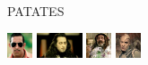 \documentclass{exam}
\begin{document}
\begin{questions}
\question PATATES\newline
\begin{oneparchoices}
\choice \includegraphics[height=2em]{arifisik.jpg}
\choice \includegraphics[height=2em]{komutanlogar.jpeg}
\choice \includegraphics[height=2em]{faruk.jpg}
\choice \includegraphics[height=2em]{216.jpg}
\end{oneparchoices}
\end{questions}
\end{document}
